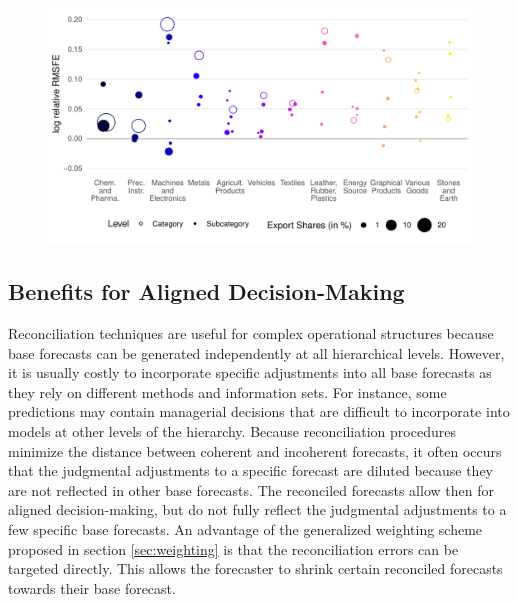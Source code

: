 \documentclass[a4paper,fleqn,11pt]{article}
\begin{document}
\begin{figure}[H]
	\includegraphics[width=\textwidth]{fig/fig_eval_categories}
	\label{fig:eval_categories}
\end{figure}

\subsection{Benefits for Aligned Decision-Making}\label{sec:resweight}

Reconciliation techniques are useful for complex operational structures because base forecasts can be generated independently at all hierarchical levels. However, it is usually costly to incorporate specific adjustments into all base forecasts as they rely on different methods and information sets. For instance, some predictions may contain managerial decisions that are difficult to incorporate into models at other levels of the hierarchy. Because reconciliation procedures minimize the distance between coherent and incoherent forecasts, it often occurs that the judgmental adjustments to a specific forecast are diluted because they are not reflected in other base forecasts. The reconciled forecasts allow then for aligned decision-making, but do not fully reflect the judgmental adjustments to a few specific base forecasts. An advantage of the generalized weighting scheme proposed in section \ref{sec:weighting} is that the reconciliation errors can be targeted directly. This allows the forecaster to shrink certain reconciled forecasts towards their base forecast.
\end{document}
